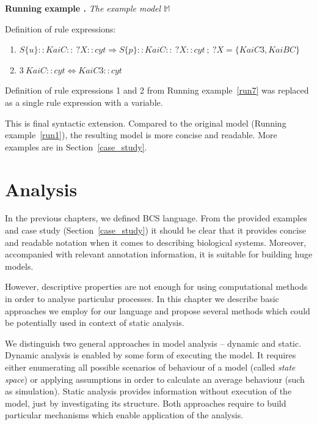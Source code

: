 \documentclass[12pt, twoside]{fithesis2} %
\newcounter{counter}[section]
\renewcommand{\thecounter}{\thesection.\arabic{counter}}
\newenvironment{runningExample}[1]{\bigskip\refstepcounter{counter}\noindent\textbf{Running example \thecounter} \emph{#1} \par\nopagebreak}{\bigskip}
\begin{document}
\begin{runningExample}{The example model $\mathds{M}$}
\label{run8}
\noindent Definition of rule expressions:
{\small
\begin{enumerate}
\item \hspace*{-0.6cm} $S\{u\}::KaiC::~?X::cyt \Rightarrow S\{p\}::KaiC::~?X::cyt ~;~ ?X = \{KaiC3, KaiBC\}$

\item \hspace*{-0.6cm} $3~KaiC::cyt \Leftrightarrow KaiC3::cyt$
\end{enumerate}
}
\end{runningExample}

\noindent Definition of rule expressions 1 and 2 from Running example~\ref{run7} was replaced as a single rule expression with a variable.

This is final syntactic extension. Compared to the original model (Running example~\ref{run1}), the resulting model is more concise and readable. More examples are in Section~\ref{case_study}.

\chapter{Analysis}
\label{analysis}

In the previous chapters, we defined BCS language. From the provided examples and case study (Section~\ref{case_study}) it should be clear that it provides concise and readable notation when it comes to describing biological systems. Moreover, accompanied with relevant annotation information, it is suitable for building huge models.

However, descriptive properties are not enough for using computational methods in order to analyse particular processes. In this chapter we describe basic approaches we employ for our language and propose several methods which could be potentially used in context of static analysis.

We distinguish two general approaches in model analysis -- dynamic and static. Dynamic analysis is enabled by some form of executing the model. It requires either enumerating all possible scenarios of behaviour of a model (called \emph{state space}) or applying assumptions in order to calculate an average behaviour (such as simulation). Static analysis provides information without execution of the model, just by investigating its structure. Both approaches require to build particular mechanisms which enable application of the analysis.
\end{document}
